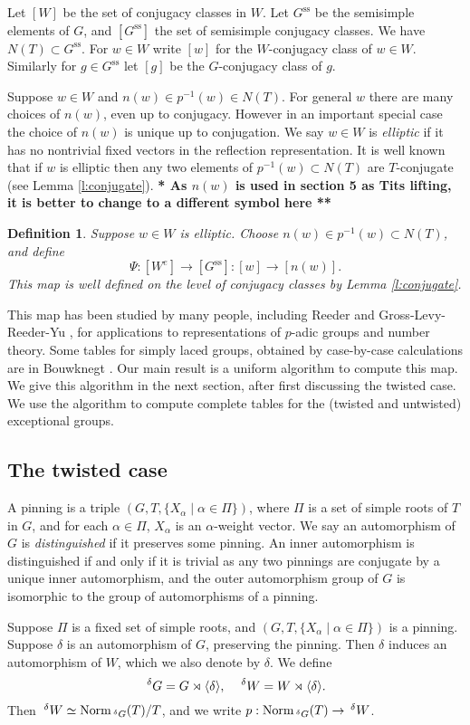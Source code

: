 \documentclass[10pt,leqno]{article}
\newcommand{\remind}[1]{{\bf ** #1 **}}
\newtheorem{definition}[equation]{Definition}
\newcommand{\Norm}{\text{Norm}}
\newcommand{\subsec}[1]{\subsection{#1}
\renewcommand{\theequation}{\thesubsection.\arabic{equation}}}
\newcommand\inv{^{-1}}
\newcommand{\Wconj}{[W]}
\newcommand{\Weconj}{[{W^e}]}
\newcommand{\Gssconj}{[{G^\text{ss}}]}
\renewcommand{\ss}{\text{ss}}
\newcommand{\Gss}{G^\ss}
\newcommand{\Wext}{\negthinspace\negthinspace\phantom{a}^\delta W}
\newcommand{\Gext}{\negthinspace\negthinspace\phantom{a}^\delta G}
\begin{document}
Let $\Wconj$ be the set of conjugacy classes in $W$. Let $\Gss$ be the
semisimple elements of $G$, and $\Gssconj$ the set of semisimple
conjugacy classes. We have $N(T)\subset \Gss$. For $w\in W$ write $[w]$ for the $W$-conjugacy
class of $w\in W$. Similarly for $g\in \Gss$ let $[g]$ be the
$G$-conjugacy class of $g$.

Suppose $w\in W$ and $n(w)\in p\inv(w)\in N(T)$. For general $w$ there
are many choices of $n(w)$, even up to conjugacy.  However in an
important special case the choice of $n(w)$ is unique up to
conjugation. We say $w\in W$ is {\it elliptic} if it has no nontrivial fixed
vectors in the reflection representation.  It is well known that if
$w$ is elliptic then any two elements of $p\inv(w)\subset N(T)$ are
$T$-conjugate (see Lemma \ref{l:conjugate}). \remind{As $n(w)$ is used in section 5 as Tits lifting, it is better to change to a different symbol here}

\begin{definition}
\label{d:basic}
Suppose $w\in W$ is elliptic.
Choose $n(w)\in p\inv(w)\subset N(T)$, and define
$$
\Psi: \Weconj\rightarrow\Gssconj: [w]\rightarrow [n(w)].
$$
This map is well defined on the level of conjugacy classes by Lemma \ref{l:conjugate}.
\end{definition}

This map has been studied by many people, including Reeder
\cite{reeder_torsion} and Gross-Levy-Reeder-Yu \cite{rgly}, for
applications to representations of $p$-adic groups and number theory.
Some tables for simply laced groups, obtained by case-by-case
calculations are in Bouwknegt \cite{bouwknegt}.  Our main result is a
uniform algorithm to compute this map. We give this algorithm in the
next section, after first discussing the twisted case. We use the
algorithm to compute complete tables for the (twisted and untwisted) exceptional
groups.

\subsec{The twisted case}
\label{s:twisted}

A pinning is a triple $(G,T,\{X_\alpha\mid \alpha\in\Pi\})$,
where $\Pi$ is a set of simple roots of $T$ in $G$, and for each
$\alpha\in\Pi$, $X_\alpha$ is an $\alpha$-weight vector.  
We say an automorphism of $G$ is {\it distinguished} if it preserves some pinning.  An
inner automorphism is distinguished if and only if it is trivial as
any two pinnings are conjugate by a unique inner automorphism,
and the
outer automorphism group of $G$ is isomorphic to the group of
automorphisms of a pinning.

Suppose $\Pi$ is a fixed set of simple roots, and
$(G,T,\{X_\alpha\mid\alpha\in\Pi\})$ is a pinning.
Suppose $\delta$ is an automorphism of $G$, preserving
the pinning.
Then $\delta$ induces an
automorphism of $W$, which we also denote by $\delta$. We define
$$
\Gext=G \rtimes\langle\delta\rangle, \quad \Wext=W\rtimes\langle\delta\rangle.
$$
Then $\Wext\simeq \Norm_{\Gext}(T)/T$, and we write $p:\Norm_{\Gext}(T)\rightarrow \Wext$.
\end{document}
